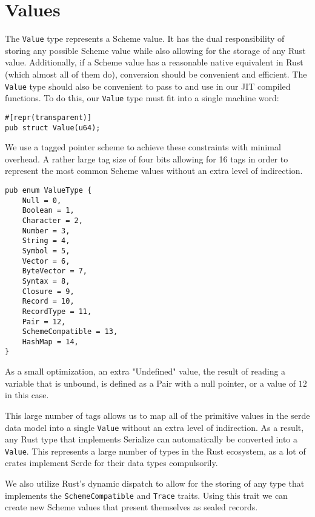 \documentclass[sigplan,review,anonymous]{acmart}
\begin{document}
\section{Values}

The \texttt{Value} type represents a Scheme value. It has the dual responsibility
of storing any possible Scheme value while also allowing for the storage of any
Rust value. Additionally, if a Scheme value has a reasonable native equivalent
in Rust (which almost all of them do), conversion should be convenient and
efficient. The \texttt{Value} type should also be convenient to pass to and
use in our JIT compiled functions. To do this, our \texttt{Value} type must fit
into a single machine word:

\begin{verbatim}
#[repr(transparent)]
pub struct Value(u64);
\end{verbatim}

We use a tagged pointer\cite{tags} scheme to achieve these constraints with
minimal overhead. A rather large tag size of four bits allowing for 16 tags in
order to represent the most common Scheme values without an extra level of
indirection.

\begin{verbatim}
pub enum ValueType {
    Null = 0,
    Boolean = 1,
    Character = 2,
    Number = 3,
    String = 4,
    Symbol = 5,
    Vector = 6,
    ByteVector = 7,
    Syntax = 8,
    Closure = 9,
    Record = 10,
    RecordType = 11,
    Pair = 12,
    SchemeCompatible = 13,
    HashMap = 14,
}
\end{verbatim}

As a small optimization, an extra "Undefined" value, the result of reading a
variable that is unbound, is defined as a Pair with a null pointer, or a value
of $12$ in this case.

This large number of tags allows us to map all of the primitive values in the
serde data model\cite{serde} into a single \texttt{Value} without an extra level of
indirection. As a result, any Rust type that implements Serialize can
automatically be converted into a \texttt{Value}. This represents a large number of
types in the Rust ecosystem, as a lot of crates implement Serde for their data types
compulsorily.

We also utilize Rust's dynamic dispatch to allow for the storing of any type that
implements the \texttt{SchemeCompatible} and \texttt{Trace} traits. Using this
trait we can create new Scheme values that present themselves as sealed records.
\end{document}
